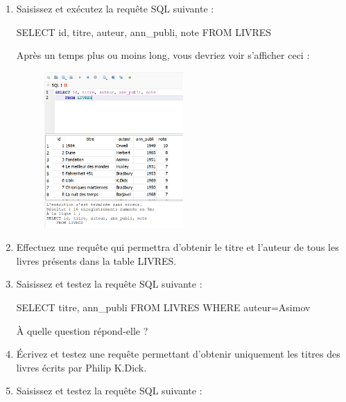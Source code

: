 \documentclass[
  a4paper,
  DIV=11,
  numbers=noendperiod]{scrartcl}
\newenvironment{Shaded}{\begin{snugshade}}{\end{snugshade}}
\newcommand{\KeywordTok}[1]{\textcolor[rgb]{0.00,0.23,0.31}{#1}}
\newcommand{\NormalTok}[1]{\textcolor[rgb]{0.00,0.23,0.31}{#1}}
\newcommand{\OperatorTok}[1]{\textcolor[rgb]{0.37,0.37,0.37}{#1}}
\newcommand{\StringTok}[1]{\textcolor[rgb]{0.13,0.47,0.30}{#1}}
\begin{document}
\begin{enumerate}
\begin{figure}
{  }

  \end{figure}
\item
  Saisissez et exécutez la requête SQL suivante :

\begin{Shaded}
\begin{Highlighting}[]
\KeywordTok{SELECT} \KeywordTok{id}\NormalTok{, titre, auteur, ann\_publi, note}
\KeywordTok{FROM}\NormalTok{ LIVRES}
\end{Highlighting}
\end{Shaded}

  Après un temps plus ou moins long, vous devriez voir s'afficher ceci :

  \begin{figure}

  {\centering \includegraphics[width=0.5\textwidth,height=\textheight]{TP1_7.png}

  }

  \end{figure}
\item
  Effectuez une requête qui permettra d'obtenir le titre et l'auteur de
  tous les livres présents dans la table LIVRES.
\item
  Saisissez et testez la requête SQL suivante :

\begin{Shaded}
\begin{Highlighting}[]
\KeywordTok{SELECT}\NormalTok{ titre, ann\_publi}
\KeywordTok{FROM}\NormalTok{ LIVRES}
\KeywordTok{WHERE}\NormalTok{ auteur}\OperatorTok{=}\StringTok{\textquotesingle{}Asimov\textquotesingle{}}
\end{Highlighting}
\end{Shaded}

  À quelle question répond-elle ?
\item
  Écrivez et testez une requête permettant d'obtenir uniquement les
  titres des livres écrits par Philip K.Dick.
\item
  Saisissez et testez la requête SQL suivante :


\end{enumerate}
\end{document}
